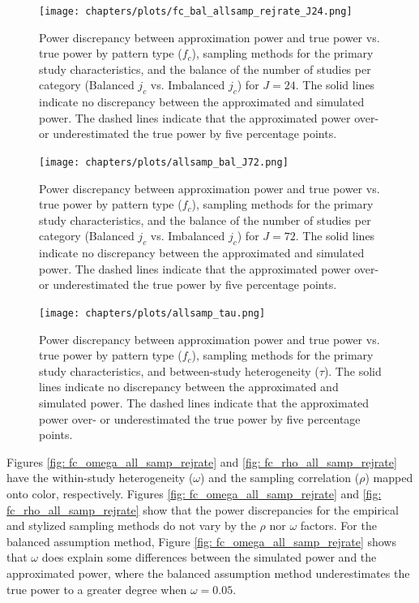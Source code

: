 \begin{figure}
    \centering\vspace{-5pt}\texttt{[image: chapters/plots/fc\_bal\_allsamp\_rejrate\_J24.png]}\caption{Power discrepancy between approximation power and true power vs. true power by pattern type ($f_c$), sampling methods for the primary study characteristics, and the balance of the number of studies per category (Balanced $j_c$ vs. Imbalanced $j_c$) for $J = 24$. The solid lines indicate no discrepancy between the approximated and simulated power. The dashed lines indicate that the approximated power over- or underestimated the true power by five percentage points. \label{fig: fc_bal_allsamp_rejrate_J24}}
    \vspace{-5pt}
\end{figure}



\begin{figure}
    \centering
    \vspace{-5pt}\texttt{[image: chapters/plots/allsamp\_bal\_J72.png]}\caption{Power discrepancy between approximation power and true power vs. true power by pattern type ($f_c$), sampling methods for the primary study characteristics, and the balance of the number of studies per category (Balanced $j_c$ vs. Imbalanced $j_c$) for $J = 72$. The solid lines indicate no discrepancy between the approximated and simulated power. The dashed lines indicate that the approximated power over- or underestimated the true power by five percentage points. \label{fig: allsamp_bal_J72}}
    \vspace{-5pt}
\end{figure}

\begin{figure}
    \centering
    \vspace{-5pt}\texttt{[image: chapters/plots/allsamp\_tau.png]}\caption{Power discrepancy between approximation power and true power vs. true power by pattern type ($f_c$), sampling methods for the primary study characteristics, and between-study heterogeneity ($\tau$). The solid lines indicate no discrepancy between the approximated and simulated power. The dashed lines indicate that the approximated power over- or underestimated the true power by five percentage points. \label{fig: allsamp_tau}}
    \vspace{-5pt}
\end{figure}

Figures \ref{fig: fc_omega_all_samp_rejrate} and \ref{fig: fc_rho_all_samp_rejrate} have the within-study heterogeneity ($\omega$) and the sampling correlation ($\rho$) mapped onto color, respectively. Figures \ref{fig: fc_omega_all_samp_rejrate} and \ref{fig: fc_rho_all_samp_rejrate} show that the power discrepancies for the empirical and stylized sampling methods do not vary by the $\rho$ nor $\omega$ factors. For the balanced assumption method, Figure \ref{fig: fc_omega_all_samp_rejrate} shows that $\omega$ does explain some differences between the simulated power and the approximated power, where the balanced assumption method underestimates the true power to a greater degree when $\omega = 0.05$.  
 
